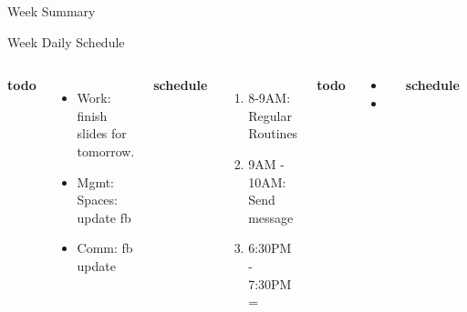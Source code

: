 \documentclass[serif, mathserif, final]{beamer}
\begin{document}
\begin{frame}
\begin{columns}
\begin{column}{0.5\linewidth}
\begin{block}{Week Summary}
{\begin{block}{Week Daily Schedule}
\begin{columns}
          \textbf{\small todo} \\
          \begin{itemize}
           \tiny \item \tiny Work: finish slides for tomorrow. 
           \item \tiny Mgmt: Spaces: update fb 
         \item \tiny Comm: fb update 
          \end{itemize}
          \textbf{\small schedule} \\
          \begin{enumerate}
            \tiny \item \tiny 8-9AM: Regular Routines 
          \item \tiny 9AM - 10AM: Send message 
            \item \tiny 6:30PM - 7:30PM = 
          \end{enumerate} 
          \textbf{\small todo}\\
          \begin{itemize}  
            \tiny \item \tiny 
          \item \tiny 
          \end{itemize} 

          \textbf{\small schedule}\\
          \begin{enumerate} 
            \tiny \item \tiny 8-9AM = Regular Routines 
            \item \tiny 12-1PM = gather notes about job org. during
              session 
            \item \tiny 3:30PM - 4:30PM = meeting 
            \item \tiny 6PM - 9PM = revise emot. int. chapter and
              structure wl-cheat based on it 
          \end{enumerate}  
          

\end{columns}
\end{block}}
\end{block}
\end{column}
\end{columns}
\end{frame}
\end{document}
